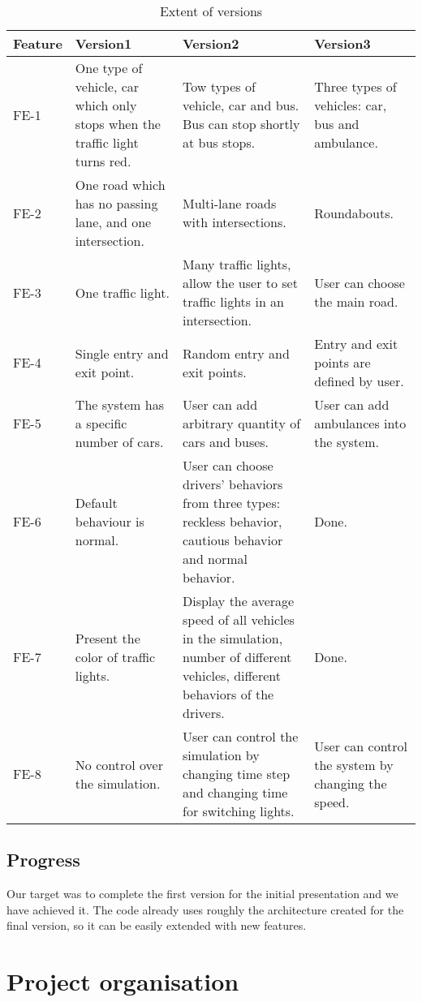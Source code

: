 \documentclass[a4paper,12pt]{article}
\begin{document}
\begin{table}[!htbp]
\centering
\label{versiontable}
\caption{Extent of versions}
\begin{tabular}{|p{1.2cm}|p{3.8cm}|p{4.5cm}|p{3cm}|}
\hline
Feature & Version1 & Version2  & Version3\\
\hline
FE-1& One type of vehicle, car which only stops when the traffic light turns red. & Tow types of vehicle, car and bus. Bus can stop shortly at bus stops. & Three types of vehicles: car, bus and ambulance.\\
\hline
FE-2& One road which has no passing lane, and one intersection. & Multi-lane roads with intersections. & Roundabouts.\\
\hline
FE-3& One traffic light. & Many traffic lights, allow the user to set traffic lights in an intersection. & User can choose the main road.\\
\hline
FE-4& Single entry and exit point. & Random entry and exit points. & Entry and exit points are defined by user.\\
\hline
FE-5& The system has a specific number of cars. & User can add arbitrary quantity of cars and buses. & User can add ambulances into the system.\\
\hline
FE-6& Default behaviour is normal. & User can choose drivers' behaviors from three types: reckless behavior, cautious behavior and normal behavior. & Done.\\
\hline
FE-7& Present the color of traffic lights. & Display the average speed of all vehicles in the simulation, number of different vehicles, different behaviors of the drivers. & Done.\\
\hline
FE-8& No control over the simulation. & User can control the simulation by changing time step and changing time for switching lights. & User can control the system by changing the speed.\\
\hline
\end{tabular}
\end{table}

\subsection{Progress}
Our target was to complete the first version for the initial presentation and we have achieved it. The code already uses roughly the architecture created for the final version, so it can be easily extended with new features.

\section{Project organisation}
\end{document}
